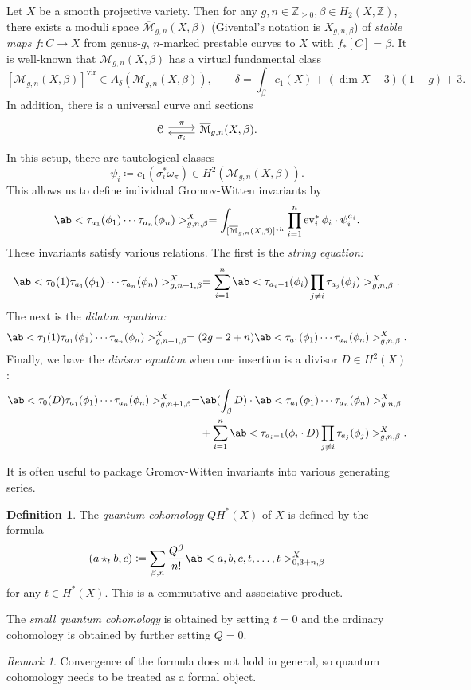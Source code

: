 \documentclass[leqno, openany]{memoir}
\theoremstyle{definition}
\newtheorem{defn}[thm]{Definition}
\theoremstyle{remark}
\newtheorem{rmk}[thm]{Remark}
\theoremstyle{plain}
\theoremstyle{definition}
\theoremstyle{remark}
\newcommand{\Z}{\mathbb{Z}}
\newcommand{\mc}[1]{\mathcal{#1}}
\newcommand{\mr}[1]{\mathrm{#1}}
\newcommand{\on}[1]{\operatorname{#1}}
\newcommand{\Mbar}{\overline{\mathcal{M}}}
\begin{document}
Let $X$ be a smooth projective variety. Then for any $g,n \in \Z_{\geq 0}, \beta \in H_2(X,\Z)$, there exists a moduli space $\Mbar_{g,n}(X,\beta)$ (Givental's notation is $X_{g,n,\beta}$) of \textit{stable maps} $f \colon C \to X$ from genus-$g$, $n$-marked prestable curves to $X$ with $f_*[C] = \beta$. It is well-known that $\Mbar_{g,n}(X,\beta)$ has a virtual fundamental class
\[ [\Mbar_{g,n}(X,\beta)]^{\mr{vir}} \in A_{\delta}(\Mbar_{g,n}(X,\beta)), \qquad \delta = \int_{\beta} c_1(X) + (\dim X - 3)(1-g) + 3. \]
In addition, there is a universal curve and sections
\begin{equation*}
\begin{tikzcd}
    \mc{C} \ar[shift left=1]{r}{\pi} & \Mbar_{g,n}(X,\beta) \ar[shift left=1]{l}{\sigma_i}.
\end{tikzcd}
\end{equation*}
In this setup, there are tautological classes
\[ \psi_i \coloneqq c_1(\sigma_i^* \omega_{\pi}) \in H^2(\Mbar_{g,n}(X,\beta)). \]
This allows us to define individual Gromov-Witten invariants by
\[ \ab<\tau_{a_1}(\phi_1) \cdots \tau_{a_n}(\phi_n)>_{g,n,\beta}^X = \int_{[\Mbar_{g,n}(X,\beta)]^{\mr{vir}}} \prod_{i=1}^n \on{ev}_i^* \phi_i \cdot \psi_i^{a_i}. \]
These invariants satisfy various relations. The first is the \textit{string equation:}
\[ \ab<\tau_0(1) \tau_{a_1}(\phi_1) \cdots \tau_{a_n}(\phi_n)>_{g,n+1,\beta}^X = \sum_{i=1}^n \ab<\tau_{a_i-1}(\phi_i)\prod_{j\neq i} \tau_{a_j}(\phi_j)>_{g,n,\beta}^X. \]
The next is the \textit{dilaton equation:}
\[ \ab<\tau_1(1) \tau_{a_1}(\phi_1) \cdots \tau_{a_n}(\phi_n)>_{g,n+1,\beta}^X = (2g-2+n)\ab<\tau_{a_1}(\phi_1) \cdots \tau_{a_n}(\phi_n)>_{g,n,\beta}^X. \]
Finally, we have the \textit{divisor equation} when one insertion is a divisor $D \in H^2(X)$:
\begin{align*}
    \ab<\tau_0(D)\tau_{a_1}(\phi_1)\cdots \tau_{a_n}(\phi_n)>_{g,n+1,\beta}^X =&{} \ab(\int_{\beta} D) \cdot \ab<\tau_{a_1}(\phi_1) \cdots \tau_{a_n}(\phi_n)>_{g,n,\beta}^X \\
    &+ \sum_{i=1}^n \ab<\tau_{a_i-1}(\phi_i \cdot D)\prod_{j\neq i} \tau_{a_j}(\phi_j)>_{g,n,\beta}^X.
\end{align*}

It is often useful to package Gromov-Witten invariants into various generating series.

\begin{defn}
    The \textit{quantum cohomology} $QH^*(X)$ of $X$ is defined by the formula
    \[ (a \star_t b, c) \coloneqq \sum_{\beta, n} \frac{Q^{\beta}}{n!} \ab<a,b,c,t,\ldots,t>_{0,3+n,\beta}^X \]
    for any $t \in H^*(X)$. This is a commutative and associative product.
\end{defn}
The \textit{small quantum cohomology} is obtained by setting $t=0$ and the ordinary cohomology is obtained by further setting $Q=0$.
\begin{rmk}
    Convergence of the formula does not hold in general, so quantum cohomology needs to be treated as a formal object.
\end{rmk}
\end{document}
